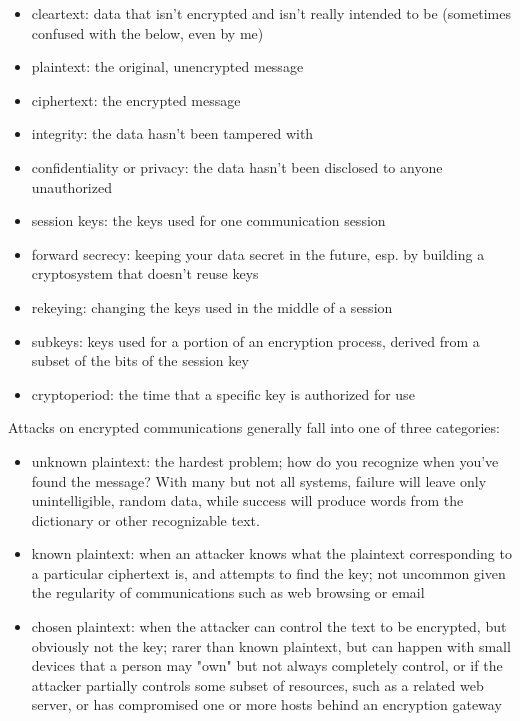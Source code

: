\begin{itemize}
\item cleartext: data that isn't encrypted and isn't really intended to be
  (sometimes confused with the below, even by me)
\item plaintext: the original, unencrypted message
\item ciphertext: the encrypted message
\item integrity: the data hasn't been tampered with
\item confidentiality or privacy: the data hasn't been disclosed to anyone unauthorized
\item session keys: the keys used for one communication session
\item forward secrecy: keeping your data secret in the future, esp. by
  building a cryptosystem that doesn't reuse keys
\item rekeying: changing the keys used in the middle of a session
\item subkeys: keys used for a portion of an encryption process, derived
  from a subset of the bits of the session key
\item cryptoperiod: the time that a specific key is authorized for use
\end{itemize}

Attacks on encrypted communications generally fall into one of three
categories:

\begin{itemize}
\item unknown plaintext: the hardest problem; how do you recognize when
  you've found the message?  With many but not all systems, failure
  will leave only unintelligible, random data, while success will
  produce words from the dictionary or other recognizable text.
\item known plaintext: when an attacker knows what the plaintext
  corresponding to a particular ciphertext is, and attempts to find
  the key; not uncommon given the regularity of communications such as
  web browsing or email
\item chosen plaintext: when the attacker can control the text to be
  encrypted, but obviously not the key; rarer than known plaintext,
  but can happen with small devices that a person may "own" but not
  always completely control, or if the attacker partially controls
  some subset of resources, such as a related web server, or has
  compromised one or more hosts behind an encryption gateway
\end{itemize}

